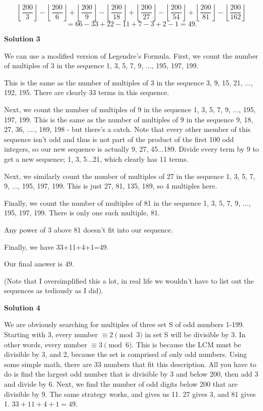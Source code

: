 \begin{enumerate}
 
 \[\left\lfloor \frac{200}{3}\right\rfloor - \left\lfloor \frac{200}{6}\right\rfloor +\left\lfloor\frac{200}{9}\right\rfloor - \left\lfloor \frac{200}{18}\right\rfloor +\left\lfloor \frac{200}{27}\right\rfloor - \left\lfloor \frac{200}{54}\right\rfloor+\left\lfloor\frac{200}{81}\right\rfloor - \left\lfloor \frac{200}{162}\right\rfloor\]
 \[= 66 - 33 + 22 - 11 + 7 - 3 + 2 - 1 = 49.\]




\textbf{Solution 3}

We can use a modified version of Legendre's Formula. First, we count the number of multiples of 3 in the sequence 1, 3, 5, 7, 9, ..., 195, 197, 199. 

 This is the same as the number of multiples of 3 in the sequence 3, 9, 15, 21, ..., 192, 195. There are clearly 33 terms in this sequence. 

 Next, we count the number of multiples of 9 in the sequence 1, 3, 5, 7, 9, ..., 195, 197, 199. This is the same as the number of multiples of 9 in the sequence 9, 18, 27, 36, ...., 189, 198 - but there's a catch. Note that every other member of this sequence isn't odd and thus is not part of the product of the first 100 odd integers, so our new sequence is actually 9, 27, 45...189. Divide every term by 9 to get a new sequence; 1, 3, 5...21, which clearly has 11 terms. 

 Next, we similarly count the number of multiples of 27 in the sequence 1, 3, 5, 7, 9, ..., 195, 197, 199. This is just 27, 81, 135, 189, so 4 multiples here. 

 Finally, we count the number of multiples of 81 in the sequence 1, 3, 5, 7, 9, ..., 195, 197, 199. There is only one such multiple, 81. 

 Any power of 3 above 81 doesn't fit into our sequence. 

 Finally, we have 33+11+4+1=49.

 Our final answer is 49.

 (Note that I oversimplified this a lot, in real life we wouldn't have to list out the sequences as tediously as I did).

 



\textbf{Solution 4}

We are obviously searching for multiples of three set S of odd numbers 1-199. Starting with 3, every number $\equiv 2 \pmod{3}$ in set S will be divisible by 3. In other words, every number $\equiv 3 \pmod{6}$. This is because the LCM must be divisible by 3, and 2, because the set is comprised of only odd numbers. Using some simple math, there are 33 numbers that fit this description. All you have to do is find the largest odd number that is divisible by 3 and below 200, then add 3 and divide by 6. Next, we find the number of odd digits below 200 that are divisible by 9. The same strategy works, and gives us 11. 27 gives 3, and 81 gives 1. $33 + 11 + 4 + 1 = \boxed{49}$.


\end{enumerate}
